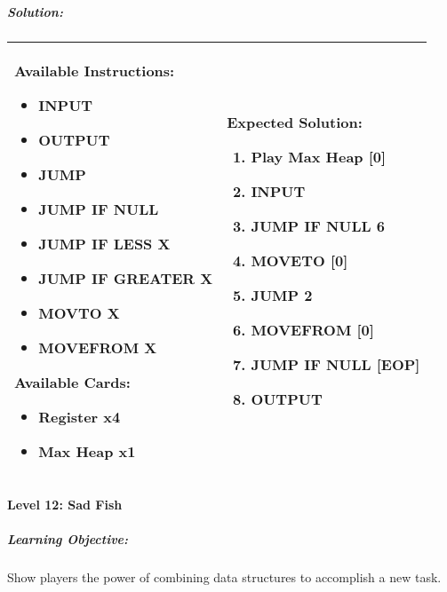\newpage
\subparagraph{Solution:} 
\begin{center}
    \begin{tabular}{ | m{5cm} | m{9cm} | } 
        \hline
            \textbf{Available Instructions:} 
            \begin{itemize}
                \setlength\itemsep{-.35em}
                \item INPUT
                \item OUTPUT
                \item JUMP
                \item JUMP IF NULL
                \item JUMP IF LESS X
                \item JUMP IF GREATER X
                \item MOVTO X
                \item MOVEFROM X
            \end{itemize}
            \textbf{Available Cards:} 
            \begin{itemize}
                \setlength\itemsep{-.35em}
                \item Register x4
                \item Max Heap x1
            \end{itemize}& 
            \textbf{Expected Solution:} 
            \begin{enumerate}
                \setlength\itemsep{-.35em}
                \item Play Max Heap [0]
                \item INPUT
                \item JUMP IF NULL 6
                \item MOVETO [0]
                \item JUMP 2
                \item MOVEFROM [0]
                \item JUMP IF NULL [EOP]
                \item OUTPUT
            \end{enumerate}
            \\
        \hline
    \end{tabular}
\end{center}

\paragraph{Level 12: Sad Fish}
\subparagraph{Learning Objective:} Show players the power of combining data 
structures to accomplish a new task.

